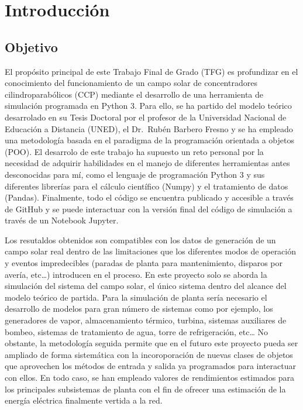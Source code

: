 \chapter{Introducción}
\label{introduccion}

\section{Objetivo}
El propósito principal de este Trabajo Final de Grado (TFG) es profundizar en el conocimiento del funcionamiento de un campo solar de concentradores cilindroparabólicos (CCP) mediante el desarrollo de una herramienta de simulación programada en Python 3. Para ello, se ha partido del modelo teórico desarrolado en su Tesis Doctoral por el profesor de la Universidad Nacional de Educación a Distancia (UNED), el Dr.~Rubén Barbero Fresno y se ha empleado una metodología basada en el paradigma de la programación orientada a objetos (POO). El desarrolo de este trabajo ha supuesto un reto personal por la necesidad de adquirir habilidades en el manejo de diferentes herramientas antes desconocidas para mí, como el lenguaje de programación Python 3 y sus diferentes librerías para el cálculo científico (Numpy) y el tratamiento de datos (Pandas). Finalmente, todo el código se encuentra publicado y accesible a través de GitHub y se puede interactuar con la versión final del código de simulación a través de un Notebook Jupyter.

Los resutaldos obtenidos son compatibles con los datos de generación de un campo solar real dentro de las limitaciones que los diferentes modos de operación y eventos impredecibles (paradas de planta para mantenimiento, disparos por avería, etc\ldots{}) introducen en el proceso. En este proyecto solo se aborda la simulación del sistema del campo solar, el único sistema dentro del alcance del modelo teórico de partida. Para la simulación de planta sería necesario el desarrollo de
modelos para gran número de sistemas como por ejemplo, los generadores de vapor, almacenamiento térmico, turbina, sistemas auxiliares de bombeo, sistemas de tratamiento de agua, torre de refrigeración, etc\ldots{} No obstante, la metodología seguida permite que en el futuro este proyecto pueda ser ampliado de forma sistemática con la incoroporación de nuevas clases de objetos que aprovechen los métodos de entrada y salida ya programados para interactuar con ellos. En todo caso, se han empleado valores de rendimientos estimados para los principales subsistemas de planta con el fin de ofrecer una estimación de la energía eléctrica finalmente vertida a la red.

